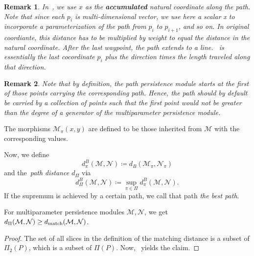 \documentclass[sigconf, nonacm, natbib=false]{acmart} %
\def\M {{\mathcal{M}}}
\def\N {{\mathcal{N}}}
\def\matchdist{d_{\textnormal{match}}}
\def\path{\pi}
\def\pathset{\Pi}
\def\pathdist{d_{\pathset}}
\let\svtodo\todo
\renewcommand\todo[1]{\svtodo[inline]{#1}}
\newcommand{\XS}[1]{\todo{XS:~#1}}
\theoremstyle{plain}
\newtheorem{remark}{Remark}
\begin{document}
\begin{remark}
In~, we use $x$ as the \textbf{accumulated} natural coordinate along the path. Note that since each $p_i$ is multi-dimensional vector, we use here a scalar x to incorporate a parameterization of the path from $p_i$ to $p_{i+1}$, and so on. In original coordiante, this distance has to be multiplied by weight to equal the distance in the natural coordinate.
After the last waypoint, the path extends to a line.~ is essentially the last cocordinate $p_i$ plus the direction times the length traveled along that direction.
\end{remark}

\begin{remark}
Note that by definition, the path persistence module starts at the first of those points carrying the corresponding path. Hence, the path should by default be carried by a collection of points such that the first point would not be greater than the degree of a generator of the multiparameter persistence module.
\end{remark}

\begin{definition}\label{def:path_bottleneck_dist}
The morphisms $\M_\pi(x,y)$ are defined to be those inherited from $\M$ with the corresponding values.

Now, we define
\begin{equation}
d_\pi^B(\M,\N) \coloneqq d_B(\M_\path,\N_\path)  
\end{equation}
and the~\emph{path distance $\pathdist$} via 
\begin{equation}
\pathdist^B(\M,\N) \coloneqq \sup_{\path\in\pathset} d^B_\path(\M,\N).
\end{equation}
If the supremum is achieved by a certain path, we call that path \emph{the best path}. 
\end{definition}

\begin{corollary}
For multiparameter persistence modules $\M,\N$, we get $\pathdist(\M,\N)\geq \matchdist(\M,\N)$.
\end{corollary}

\begin{proof}
The set of all slices in the definition of the matching distance is a subset of $\pathset_2(P)$, which is a subset of $\pathset(P)$. Now,~ yields the claim.
\end{proof}
\end{document}
